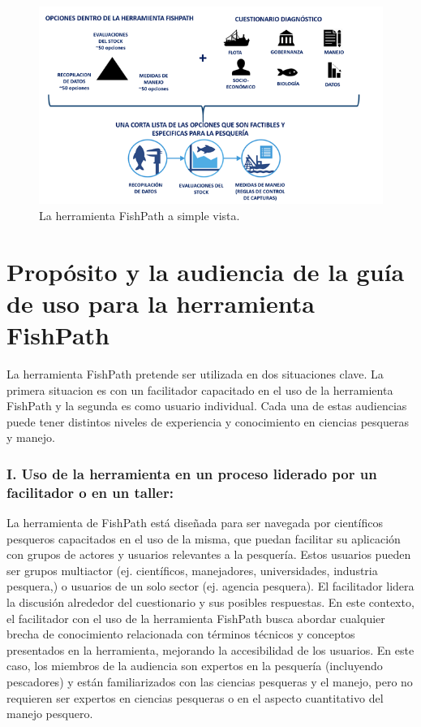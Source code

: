 \documentclass[
  11pt,
]{book}
\begin{document}
\begin{figure}

{\centering \includegraphics[width=0.75\linewidth]{images/fishpath-tool-overview-diagram-es} 

}

\caption{La herramienta FishPath a simple vista.}\label{fig:overview}
\end{figure}

\hypertarget{propuxf3sito-y-la-audiencia-de-la-guuxeda-de-uso-para-la-herramienta-fishpath}{%
\section{Propósito y la audiencia de la guía de uso para la herramienta FishPath}\label{propuxf3sito-y-la-audiencia-de-la-guuxeda-de-uso-para-la-herramienta-fishpath}}

La herramienta FishPath pretende ser utilizada en dos situaciones clave. La primera situacion es con un facilitador capacitado en el uso de la herramienta FishPath y la segunda es como usuario individual. Cada una de estas audiencias puede tener distintos niveles de experiencia y conocimiento en ciencias pesqueras y manejo.

\hypertarget{i.-uso-de-la-herramienta-en-un-proceso-liderado-por-un-facilitador-o-en-un-taller}{%
\subsubsection{I. Uso de la herramienta en un proceso liderado por un facilitador o en un taller:}\label{i.-uso-de-la-herramienta-en-un-proceso-liderado-por-un-facilitador-o-en-un-taller}}

La herramienta de FishPath está diseñada para ser navegada por científicos pesqueros capacitados en el uso de la misma, que puedan facilitar su aplicación con grupos de actores y usuarios relevantes a la pesquería. Estos usuarios pueden ser grupos multiactor (ej. científicos, manejadores, universidades, industria pesquera,) o usuarios de un solo sector (ej. agencia pesquera). El facilitador lidera la discusión alrededor del cuestionario y sus posibles respuestas. En este contexto, el facilitador con el uso de la herramienta FishPath busca abordar cualquier brecha de conocimiento relacionada con términos técnicos y conceptos presentados en la herramienta, mejorando la accesibilidad de los usuarios. En este caso, los miembros de la audiencia son expertos en la pesquería (incluyendo pescadores) y están familiarizados con las ciencias pesqueras y el manejo, pero no requieren ser expertos en ciencias pesqueras o en el aspecto cuantitativo del manejo pesquero.
\end{document}
